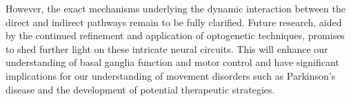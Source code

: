 \documentclass[10pt]{article}
\begin{document}
\begin{sloppypar}
  However, the exact mechanisms underlying the dynamic interaction between the direct and indirect pathways remain to be fully clarified. Future research, aided by the continued refinement and application of optogenetic techniques, promises to shed further light on these intricate neural circuits. This will enhance our understanding of basal ganglia function and motor control and have significant implications for our understanding of movement disorders such as Parkinson’s disease and the development of potential therapeutic strategies.

  \pagebreak
  \singlespacing %
  
  

\end{sloppypar}
\end{document}
